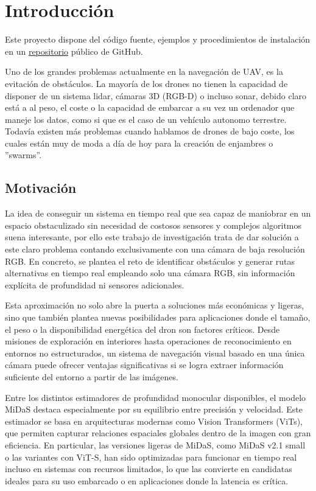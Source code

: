   \chapter{Introducción}
Este proyecto dispone del código fuente, ejemplos y procedimientos de instalación en un \href{https://github.com/andrelorenzo/Vision2D_navigation}{repositorio} público de GitHub.

Uno de los grandes problemas actualmente en la navegación de UAV, es la evitación de obstáculos. La mayoría de los drones no tienen la capacidad de disponer de un sistema lidar, cámaras 3D (RGB-D) o incluso sonar, debido claro está a al peso, el coste o la capacidad de embarcar a su vez un ordenador que maneje los datos, como si que es el caso de un vehículo autonomo terrestre. Todavía existen más problemas cuando hablamos de drones de bajo coste, los cuales están muy de moda a día de hoy para la creación de enjambres o ''swarms''.

    \section{Motivación}
La idea de conseguir un sistema en tiempo real que sea capaz de maniobrar en un espacio obstaculizado sin necesidad de costosos sensores y complejos algoritmos suena interesante, por ello este trabajo de investigación trata de dar solución a este claro problema contando exclusivamente con una cámara de baja resolución RGB. En concreto, se plantea el reto de identificar obstáculos y generar rutas alternativas en tiempo real empleando solo una cámara RGB, sin información explícita de profundidad ni sensores adicionales.

Esta aproximación no solo abre la puerta a soluciones más económicas y ligeras, sino que también plantea nuevas posibilidades para aplicaciones donde el tamaño, el peso o la disponibilidad energética del dron son factores críticos. Desde misiones de exploración en interiores hasta operaciones de reconocimiento en entornos no estructurados, un sistema de navegación visual basado en una única cámara puede ofrecer ventajas significativas si se logra extraer información suficiente del entorno a partir de las imágenes.

Entre los distintos estimadores de profundidad monocular disponibles, el modelo MiDaS destaca especialmente por su equilibrio entre precisión y velocidad. Este estimador se basa en arquitecturas modernas como Vision Transformers (ViTs), que permiten capturar relaciones espaciales globales dentro de la imagen con gran eficiencia. En particular, las versiones ligeras de MiDaS, como MiDaS v2.1 small o las variantes con ViT-S, han sido optimizadas para funcionar en tiempo real incluso en sistemas con recursos limitados, lo que las convierte en candidatas ideales para su uso embarcado o en aplicaciones donde la latencia es crítica.

